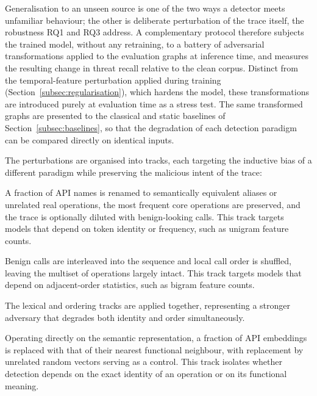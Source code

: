 \documentclass[%
    BCOR=10mm,
    DIV=13,
    toc=bibliography,
    toc=listof,
    oneside,
    12pt,
]{scrbook}
\begin{document}
Generalisation to an unseen source is one of the two ways a detector meets
unfamiliar behaviour; the other is deliberate perturbation of the trace itself,
the robustness RQ1 and RQ3 address. A complementary protocol therefore subjects
the trained model, without any retraining, to a battery of adversarial
transformations applied to the evaluation graphs at inference time, and
measures the resulting change in threat recall relative to the clean corpus.
Distinct from the temporal-feature
perturbation applied during training (Section~\ref{subsec:regularisation}), which hardens the
model, these transformations are introduced purely at evaluation time as a
stress test. The same transformed graphs are presented to the classical and
static baselines of Section~\ref{subsec:baselines}, so that the degradation of
each detection paradigm can be compared directly on identical inputs.

The perturbations are organised into tracks, each targeting the inductive bias
of a different paradigm while preserving the malicious intent of the trace:

\begin{description}[leftmargin=0pt, labelwidth=0pt, labelsep=\parskip, style=nextline]

\item[\textbf{Lexical substitution.}] A fraction of API names is renamed to
semantically equivalent aliases or unrelated real operations, the most
frequent core operations are preserved, and the trace is optionally diluted with
benign-looking calls. This track targets models that depend on token identity or
frequency, such as unigram feature counts.

\item[\textbf{Ordering perturbation.}] Benign calls are interleaved into the
sequence and local call order is shuffled, leaving the multiset of operations
largely intact. This track targets models that depend on adjacent-order
statistics, such as bigram feature counts.

\item[\textbf{Combined perturbation.}] The lexical and ordering tracks are
applied together, representing a stronger adversary that degrades both identity
and order simultaneously.

\item[\textbf{Semantic-vector substitution.}] Operating directly on the semantic
representation, a fraction of API embeddings is replaced with that of their
nearest functional neighbour, with replacement by unrelated random vectors
serving as a control. This track isolates whether detection depends on the exact
identity of an operation or on its functional meaning.

\end{description}
\end{document}
